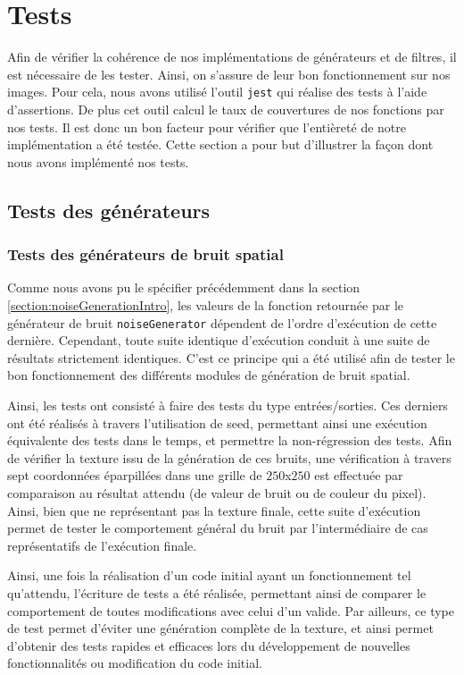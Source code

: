 \documentclass[11pt]{article}
\begin{document}
\newpage
\section{Tests}
Afin de vérifier la cohérence de nos implémentations de générateurs et de filtres, il est nécessaire de les tester. Ainsi, on s'assure de leur bon fonctionnement sur nos images. Pour cela, nous avons utilisé l'outil \texttt{jest} qui réalise des tests à l'aide d'assertions. De plus cet outil calcul le taux de couvertures de nos fonctions par nos tests. Il est donc un bon facteur pour vérifier que l'entièreté de notre implémentation a été testée. Cette section a pour but d'illustrer la façon dont nous avons implémenté nos tests.

\subsection{Tests des générateurs}

\subsubsection{Tests des générateurs de bruit spatial}

Comme nous avons pu le spécifier précédemment dans la section \ref{section:noiseGenerationIntro}, les valeurs de la fonction retournée par le générateur de bruit \texttt{noiseGenerator} dépendent de l'ordre d'exécution de cette dernière. Cependant, toute suite identique d'exécution conduit à une suite de résultats strictement identiques. C'est ce principe qui a été utilisé afin de tester le bon fonctionnement des différents modules de génération de bruit spatial.

Ainsi, les tests ont consisté à faire des tests du type entrées/sorties. Ces derniers ont été réalisés à travers l'utilisation de seed, permettant ainsi une exécution équivalente des tests dans le temps, et permettre la non-régression des tests. Afin de vérifier la texture issu de la génération de ces bruits, une vérification à travers sept coordonnées éparpillées dans une grille de $250$x$250$ est effectuée par comparaison au résultat attendu (de valeur de bruit ou de couleur du pixel). Ainsi, bien que ne représentant pas la texture finale, cette suite d'exécution permet de tester le comportement général du bruit par l'intermédiaire de cas représentatifs de l'exécution finale.

Ainsi, une fois la réalisation d'un code initial ayant un fonctionnement tel qu'attendu, l'écriture de tests a été réalisée, permettant ainsi de comparer le comportement de toutes modifications avec celui d'un valide. Par ailleurs, ce type de test permet d'éviter une génération complète de la texture, et ainsi permet d'obtenir des tests rapides et efficaces lors du développement de nouvelles fonctionnalités ou modification du code initial.
\end{document}
